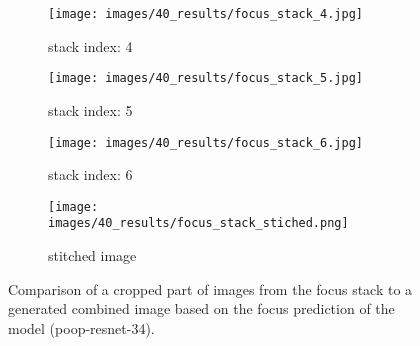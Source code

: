 \begin{figure}
    \centering
    \begin{subfigure}[b]{\textwidth}
        \centering
        \texttt{[image: images/40\_results/focus\_stack\_4.jpg]}
        \caption{stack index: 4}
        \label{fig:Results:Stack:SideBySide:Index0}
        \vspace{1em}
    \end{subfigure}

    \begin{subfigure}[b]{\textwidth}
        \centering
        \texttt{[image: images/40\_results/focus\_stack\_5.jpg]}
        \caption{stack index: 5}
        \label{fig:Results:Stack:SideBySide:Index1}
        \vspace{1em}
    \end{subfigure}

    \begin{subfigure}[b]{\textwidth}
        \centering
        \texttt{[image: images/40\_results/focus\_stack\_6.jpg]}
        \caption{stack index: 6}
        \label{fig:Results:Stack:SideBySide:Index2}
        \vspace{1em}
    \end{subfigure}

    \begin{subfigure}[b]{\textwidth}
        \centering
        \texttt{[image: images/40\_results/focus\_stack\_stiched.png]}
        \caption{stitched image}
        \label{fig:Results:Stack:SideBySide:Stiched}
    \end{subfigure}
    \caption{Comparison of a cropped part of images from the focus stack to a generated combined image based on the focus prediction of the model (\acs{poop}-\acs{resnet}-34).}
    \label{fig:Results:Stack:SideBySide}
\end{figure}

